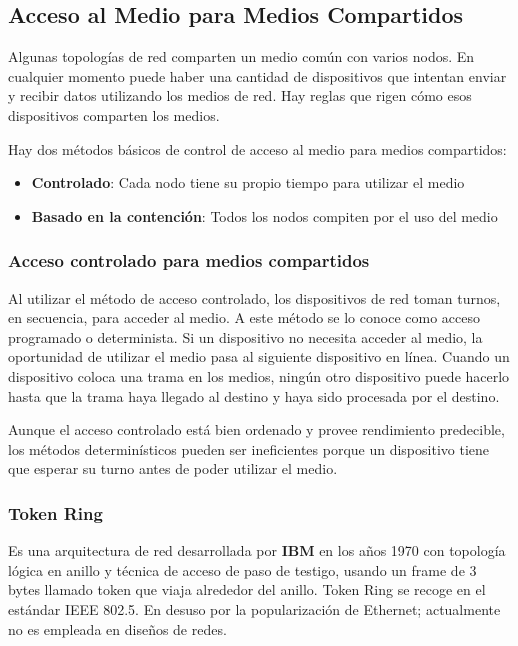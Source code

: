 \documentclass[a4paper]{article}
\begin{document}
	\subsection{Acceso al Medio para Medios Compartidos}
	
	Algunas topologías de red comparten un medio común con varios nodos. En cualquier momento puede haber una cantidad de dispositivos que intentan enviar y recibir datos utilizando los medios de red. Hay reglas que rigen cómo esos dispositivos comparten los medios.   
	
	Hay dos métodos básicos de control de acceso al medio para medios compartidos:
	
	\begin{itemize}
		\item \textbf{Controlado}: Cada nodo tiene su propio tiempo para utilizar el medio
		\item \textbf{Basado en la contención}: Todos los nodos compiten por el uso del medio 
	\end{itemize}
	
	\subsubsection{Acceso controlado para medios compartidos}
	
	Al utilizar el método de acceso controlado, los dispositivos de red toman turnos, en secuencia, para acceder al medio. A este método se lo conoce como acceso programado o determinista. Si un dispositivo no necesita acceder al medio, la oportunidad de utilizar el medio pasa al siguiente dispositivo en línea. Cuando un dispositivo coloca una trama en los medios, ningún otro dispositivo puede hacerlo hasta que la trama haya llegado al destino y haya sido procesada por el destino.  
	
	Aunque el acceso controlado está bien ordenado y provee rendimiento predecible, los métodos determinísticos pueden ser ineficientes porque un dispositivo tiene que esperar su turno antes de poder utilizar el medio.
	
	\subsubsection*{Token Ring}
	Es una arquitectura de red desarrollada por \textbf{IBM} en los años 1970 con topología lógica en anillo y técnica de acceso de paso de testigo, usando un frame de 3 bytes llamado token que viaja alrededor del anillo. Token Ring se recoge en el estándar IEEE 802.5. En desuso por la popularización de Ethernet; actualmente no es empleada en diseños de redes.
	
\end{document}
